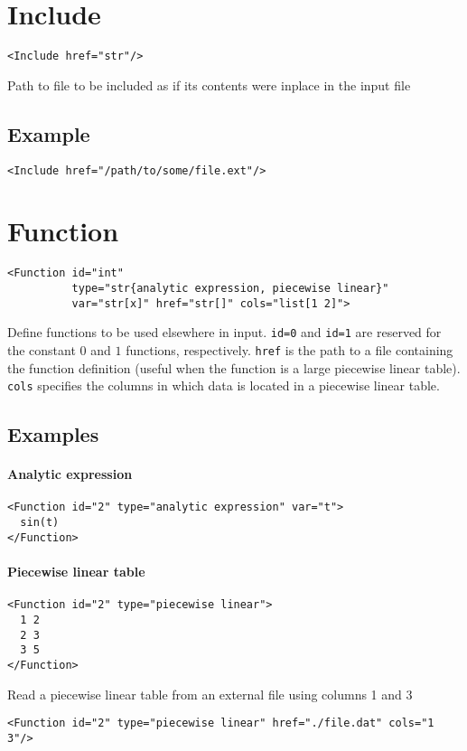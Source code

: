 \documentclass[11pt]{report}
\begin{document}
\section{Include}
\begin{verbatim}
<Include href="str"/>
\end{verbatim}
%
Path to file to be included as if its contents were inplace in the input file

\subsection{Example}
\begin{verbatim}
<Include href="/path/to/some/file.ext"/>
\end{verbatim}

\section{Function}
\begin{verbatim}
<Function id="int"
          type="str{analytic expression, piecewise linear}"
          var="str[x]" href="str[]" cols="list[1 2]">
\end{verbatim}
%
Define functions to be used elsewhere in input. \texttt{id=0} and
\texttt{id=1} are reserved for the constant $0$ and $1$ functions,
respectively. \texttt{href} is the path to a file containing the function
definition (useful when the function is a large piecewise linear table).
\texttt{cols} specifies the columns in which data is located in a piecewise
linear table.

\subsection{Examples}
\paragraph{Analytic expression}
%
\begin{verbatim}
<Function id="2" type="analytic expression" var="t">
  sin(t)
</Function>
\end{verbatim}

\paragraph{Piecewise linear table}
%
\begin{verbatim}
<Function id="2" type="piecewise linear">
  1 2
  2 3
  3 5
</Function>
\end{verbatim}
%
Read a piecewise linear table from an external file using columns 1 and 3
%
\begin{verbatim}
<Function id="2" type="piecewise linear" href="./file.dat" cols="1 3"/>
\end{verbatim}
\end{document}
